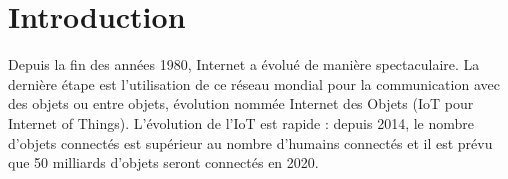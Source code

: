 \section*{Introduction}
Depuis la fin des années 1980, Internet a évolué de manière spectaculaire. La dernière étape est l'utilisation de ce réseau mondial pour la communication avec des objets ou entre objets, évolution nommée Internet des Objets (IoT pour Internet of Things). L'évolution de l'IoT est rapide : depuis 2014, le nombre d'objets connectés est supérieur au nombre d'humains connectés et il est prévu que 50 milliards d'objets seront connectés en 2020.